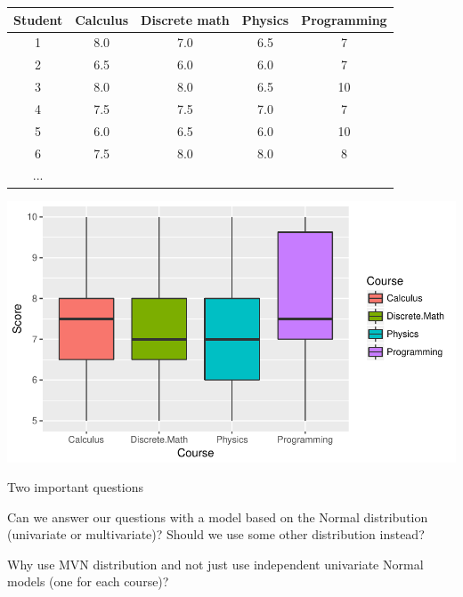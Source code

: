\begin{frame}
\begin{analysis}
\begin{minipage}[c]{0.65\linewidth}
\begin{tiny}
\hfill\begin{tabular}{ccccc}
\hline
Student &  Calculus & Discrete math & Physics & Programming \\
\hline
1  &    8.0   &        7.0  &   6.5    &       7\\
2  &    6.5   &        6.0   &  6.0     &      7\\
3  &    8.0   &        8.0  &   6.5    &      10\\
4  &    7.5   &        7.5  &   7.0    &       7\\
5  &    6.0   &        6.5  &   6.0    &      10\\
6  &    7.5   &        8.0  &   8.0    &       8\\
... \\
\hline
\hline
\end{tabular}
\end{tiny}

\begin{center}
\includegraphics[width=0.80\linewidth]{../LectureAssets/L04/StudentScoresVis01}
\end{center}

\end{minipage}
\smallskip



\smallskip

\end{analysis}
\end{frame}

\begin{frame}{Two important questions}

\begin{Large}
Can we answer our questions with a model based on the Normal distribution (univariate or multivariate)? Should we use some other distribution instead?

\bigskip

\bigskip

\bigskip

Why use MVN distribution and not just use independent univariate Normal models (one for each course)?
\end{Large}
\end{frame}

